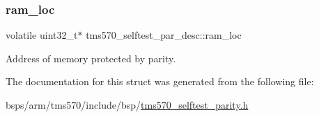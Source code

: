 \subsubsection{\texorpdfstring{ram\_loc}{ram\_loc}}
{\footnotesize\ttfamily volatile uint32\+\_\+t$\ast$ tms570\+\_\+selftest\+\_\+par\+\_\+desc\+::ram\+\_\+loc}

Address of memory protected by parity. 

The documentation for this struct was generated from the following file\+:\begin{DoxyCompactItemize}
\item 
bsps/arm/tms570/include/bsp/\mbox{\hyperlink{tms570__selftest__parity_8h}{tms570\+\_\+selftest\+\_\+parity.\+h}}\end{DoxyCompactItemize}
